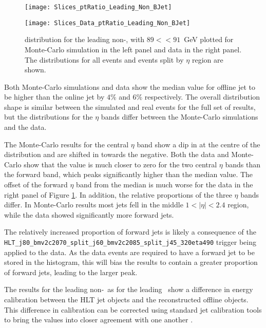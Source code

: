	\begin{figure}[h]
		\centering

		\begin{minipage}[h]{0.48\linewidth}
			\texttt{[image: Slices\_ptRatio\_Leading\_Non\_BJet]}
		\end{minipage}
		\quad
		\begin{minipage}[h]{0.48\linewidth}
			\texttt{[image: Slices\_Data\_ptRatio\_Leading\_Non\_BJet]}
		\end{minipage}
		\caption[\dptpt distribution for leading non-\bjets\ with $89<$\pt$<91$ in data and Monte-Carlo simulations]{\dptpt distribution for the leading non-\bjet, with $89<$\pt$<91$~GeV plotted for Monte-Carlo simulation in the left panel and data in the right panel. The distributions for all events and events split by $\eta$ region are shown.}
		\label{fig:O:leadingnonbptslice}
	\end{figure}

	Both Monte-Carlo simulations and data show the median value for offline jet \pt to be higher than the online jet by $4\%$ and $6\%$ respectively. The overall distribution shape is similar between the simulated and real events for the full set of results, but the distributions for the $\eta$ bands differ between the Monte-Carlo simulations and the data.

	The Monte-Carlo results for the central $\eta$ band show a dip in \pt at the centre of the distribution and are shifted in \dptpt towards the negative. Both the data and Monte-Carlo show that the \dptpt value is much closer to zero for the two central $\eta$ bands than the forward band, which peaks significantly higher than the median \dptpt value. The offset of the forward $\eta$ band from the median is much worse for the data in the right panel of Figure \ref{fig:O:leadingnonbptslice}. In addition, the relative proportions of the three $\eta$ bands differ. In Monte-Carlo results most jets fell in the middle $1<|\eta|<2.4$ region, while the data showed significantly more forward jets.

	The relatively increased proportion of forward jets is likely a consequence of the \texttt{HLT\_j80\_\-bmv2c2070\_split\_\-j60\_bmv2c2085\_split\_j45\_320eta490} trigger being applied to the data. As the data events are required to have a forward jet to be stored in the histogram, this will bias the results to contain a greater proportion of forward jets, leading to the larger peak.

	The \dptpt results for the leading non-\bjet\, as for the leading \bjet\, show a difference in energy calibration between the HLT jet objects and the reconstructed offline objects. This difference in calibration can be corrected using standard jet calibration tools to bring the \pt values into closer agreement with one another \cite{JES, jetcalib}.

